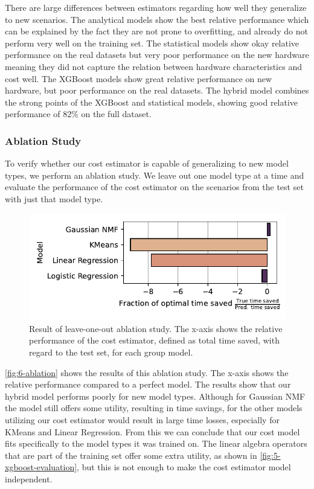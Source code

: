 There are large differences between estimators regarding how well they generalize to new scenarios. The analytical models show the best relative performance which can be explained by the fact they are not prone to overfitting, and already do not perform very well on the training set. The statistical models show okay relative performance on the real datasets but very poor performance on the new hardware meaning they did not capture the relation between hardware characteristics and cost well. The XGBoost models show great relative performance on new hardware, but poor performance on the real datasets. The hybrid model combines the strong points of the XGBoost and statistical models, showing good relative performance of 82\% on the full dataset.

\subsubsection{Ablation Study}
\label{subsubsec:6-ablation}
To verify whether our cost estimator is capable of generalizing to new model types, we perform an ablation study. We leave out one model type at a time and evaluate the performance of the cost estimator on the scenarios from the test set with just that model type.
\begin{figure}[ht]
    \centering
    \includegraphics[width=0.6\linewidth]{chapters/06_evaluation/figures/hybrid-ablation.pdf}
    \caption[Results of ablation study]{Result of leave-one-out ablation study. The x-axis shows the relative performance of the cost estimator, defined as total time saved, with regard to the test set, for each group model.}
    \label{fig:6-ablation}
\end{figure}
\autoref{fig:6-ablation} shows the results of this ablation study. The x-axis shows the relative performance compared to a perfect model. The results show that our hybrid model performs poorly for new model types. Although for Gaussian NMF the model still offers some utility, resulting in time savings, for the other models utilizing our cost estimator would result in large time losses, especially for KMeans and Linear Regression. From this we can conclude that our cost model fits specifically to the model types it was trained on. The linear algebra operators that are part of the training set offer some extra utility, as shown in \autoref{fig:5-xgboost-evaluation}, but this is not enough to make the cost estimator model independent.

